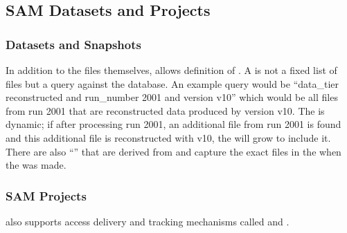 \documentclass[../main-v1.tex]{subfiles}
\begin{document}
\subsection{SAM Datasets and Projects}

\subsubsection{Datasets and Snapshots}

In addition to the files themselves,  allows %
definition of .
A   is not a fixed list of files but a query against the  database. An example query would be ``data\_tier reconstructed and run\_number 2001 and version v10'' which would be all files from run 2001 that are reconstructed data produced by version v10. The  is dynamic; if after processing run 2001, an additional file from run 2001 is found
and this additional file is reconstructed with v10, the  will grow to include it. There are also %
``'' that are derived from  and capture the exact files in the  when the  was made.





\subsubsection{SAM Projects}


 also supports access delivery and  tracking mechanisms called  and .
\end{document}
